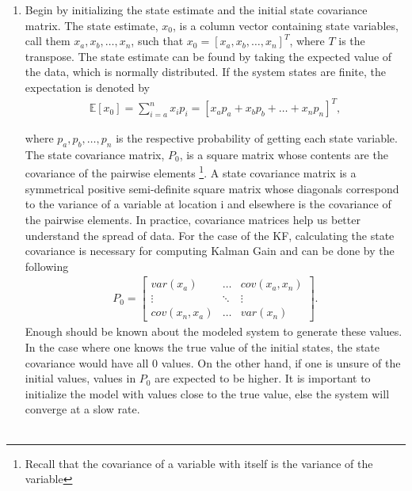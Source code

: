 \begin{enumerate}
  \item Begin by initializing the state estimate and the initial state covariance matrix. The state estimate, $x_0$,  is a  column vector containing state variables, call them $x_a, x_b, \hdots, x_n$, such that $x_0= [x_a, x_b, \hdots, x_n]^T$, where $T$ is the transpose. The state estimate can be found by taking the expected value of the data, which is normally distributed. If the system states are finite, the expectation is denoted by
    \begin{align*}
        \mathbb{E}[x_0]   = \sum^n_{i = a} x_i p_i = [x_a p_a + x_b p_b + \hdots + x_n p_n]^T,
    \end{align*}
    
    
    where $p_a, p_b, \hdots, p_n$ is the respective probability of getting each state variable. The state covariance matrix, $P_0$, is a square matrix whose contents are the covariance of the pairwise elements
    \footnote{Recall that the covariance of a variable with itself is the variance of the variable}.  A state covariance matrix is a symmetrical positive semi-definite square matrix whose diagonals correspond to the variance of a variable at location i and elsewhere is the covariance of the pairwise elements. In practice, covariance matrices help us better understand the spread of data. For the case of the KF, calculating the state covariance is necessary for computing Kalman Gain and can be done by the following
    \begin{align*}
      P_0 =
      \begin{bmatrix}
           var(x_a)  & \hdots & cov(x_a,x_n) \\
           \vdots & \ddots & \vdots \\
           cov(x_n, x_a)  & \hdots & var(x_n )
         \end{bmatrix} .
  \end{align*}
  Enough should be known about the modeled system to generate these values. In the case where one knows the true value of the initial states, the state covariance would have all 0 values. On the other hand, if one is unsure of the initial values, values in $P_0$ are expected to be higher. It is important to initialize the model with values close to the true value, else the system will converge at a slow rate.  \\ \\
  

\end{enumerate}
